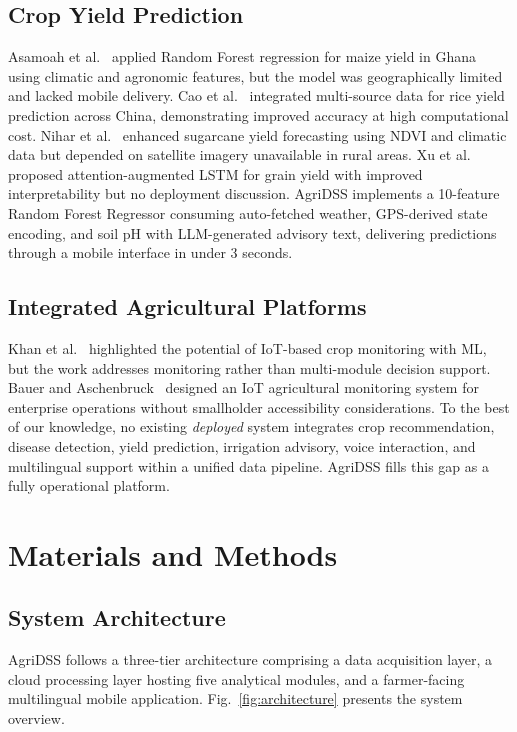 \documentclass[conference]{IEEEtran}
\begin{document}
\subsection{Crop Yield Prediction}

Asamoah et al.~\cite{b16} applied Random Forest regression for maize yield in Ghana using climatic and agronomic features, but the model was geographically limited and lacked mobile delivery. Cao et al.~\cite{b17} integrated multi-source data for rice yield prediction across China, demonstrating improved accuracy at high computational cost. Nihar et al.~\cite{b18} enhanced sugarcane yield forecasting using NDVI and climatic data but depended on satellite imagery unavailable in rural areas. Xu et al.~\cite{b19} proposed attention-augmented LSTM for grain yield with improved interpretability but no deployment discussion. AgriDSS implements a 10-feature Random Forest Regressor consuming auto-fetched weather, GPS-derived state encoding, and soil pH with LLM-generated advisory text, delivering predictions through a mobile interface in under 3 seconds.

\subsection{Integrated Agricultural Platforms}

Khan et al.~\cite{b5} highlighted the potential of IoT-based crop monitoring with ML, but the work addresses monitoring rather than multi-module decision support. Bauer and Aschenbruck~\cite{b20} designed an IoT agricultural monitoring system for enterprise operations without smallholder accessibility considerations. To the best of our knowledge, no existing \textit{deployed} system integrates crop recommendation, disease detection, yield prediction, irrigation advisory, voice interaction, and multilingual support within a unified data pipeline. AgriDSS fills this gap as a fully operational platform.

\section{Materials and Methods}

\subsection{System Architecture}

AgriDSS follows a three-tier architecture comprising a data acquisition layer, a cloud processing layer hosting five analytical modules, and a farmer-facing multilingual mobile application. Fig.~\ref{fig:architecture} presents the system overview.
\end{document}
